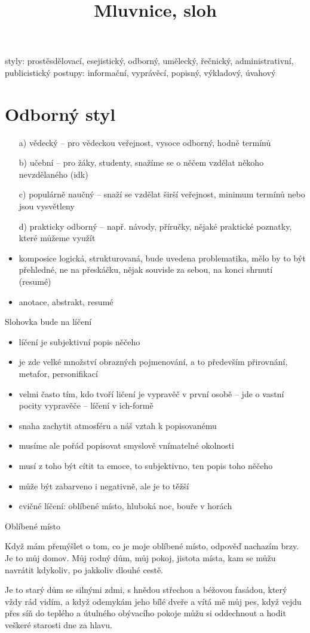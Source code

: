 \documentclass{article}
\title{\vspace{-2cm}Mluvnice, sloh\vspace{-1.7cm}}
\date{}
\author{}
\begin{document}
\maketitle
styly: prostěsdělovací, esejistický, odborný, umělecký, řečnický, administrativní, publicistický
postupy: informační, vyprávěcí, popisný, výkladový, úvahový

\part{Odborný styl}
\begin{itemize}
  \item[a)] vědecký -- pro vědeckou veřejnost, vysoce odborný, hodně termínů
  \item[b)] učební -- pro žáky, studenty, snažíme se o něčem vzdělat někoho nevzdělaného (idk)
  \item[c)] populárně naučný -- snaží se vzdělat širší veřejnost, minimum termínů nebo jsou vysvětleny
  \item[d)] prakticky odborný -- např. návody, příručky, nějaké praktické poznatky, které můžeme využít
\end{itemize}
\begin{itemize}
  \item komposice logická, strukturovaná, bude uvedena problematika, mělo by to být přehledné, ne na přeskáčku, nějak souvisle za sebou, na konci shrnutí (resumé)
  \item anotace, abstrakt, resumé
\end{itemize}

Slohovka bude na líčení
\begin{itemize}
  \item líčení je subjektivní popis něčeho
  \item je zde velké množství obrazných pojmenování, a to především přirovnání, metafor, personifikací
  \item velmi často tím, kdo tvoří ličení je vypravěč v první osobě -- jde o vastní pocity vypravěče -- líčení v ich-formě
  \item snaha zachytit atmosféru a náš vztah k popisovanému
  \item musíme ale pořád popisovat smyslově vnímatelné okolnosti
  \item musí z toho být cítit ta emoce, to subjektivno, ten popis toho něčeho
  \item může být zabarveno i negativně, ale je to těžší
  \item cvičné líčení: oblíbené místo, hluboká noc, bouře v horách
\end{itemize}

Oblíbené místo

Když mám přemýšlet o tom, co je moje oblíbené místo, odpověď nachazím brzy. Je to můj domov. Můj rodný dům, můj pokoj, jistota místa, kam se můžu navrátit kdykoliv, po jakkoliv dlouhé cestě.

Je to starý dům se silnými zdmi, s hnědou střechou a béžovou fasádou, který vždy rád vidím, a když odemykám jeho bílé dveře a vítá mě můj pes, když vejdu přes síň do teplého a útulného obývacího pokoje můžu si oddechnout a hodit veškeré starosti dne za hlavu.
\end{document}
